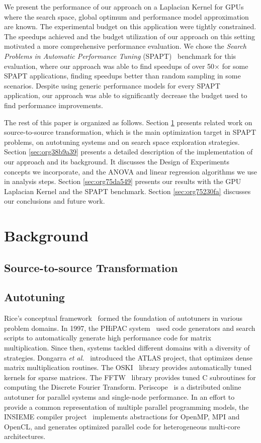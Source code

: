 \documentclass[conference]{IEEEtran}
\begin{document}
We present the performance of our approach on a Laplacian Kernel for GPUs where
the search space, global optimum and performance model approximation are known.
The experimental budget on this application were tightly constrained. The
speedups achieved and the budget utilization of our approach on this setting
motivated a more comprehensive performance evaluation. We chose the \emph{Search
Problems in Automatic Performance Tuning}
(SPAPT)~\cite{balaprakash2012spapt} benchmark for this evaluation, where
our approach was able to find speedups of over 50\(\times\) for some SPAPT
applications, finding speedups better than random sampling in some scenarios.
Despite using generic performance models for every SPAPT application, our
approach was able to significantly decrease the budget used to find performance
improvements.

The rest of this paper is organized as follows. Section \ref{sec:orgd95c21a} presents
related work on source-to-source transformation, which is the main optimization
target in SPAPT problems, on autotuning systems and on search space exploration
strategies. Section \ref{sec:org38b9a39} presents a
detailed description of the implementation of our approach and its background.
It discusses the Design of Experiments concepts we incorporate, and the ANOVA
and linear regression algorithms we use in analysis steps. Section \ref{sec:org75da549} presents our results with the GPU Laplacian Kernel and the SPAPT
benchmark. Section \ref{sec:org75230fa} discusses our conclusions and future work.
\section{Background}
\label{sec:orgd95c21a}
\subsection{Source-to-source Transformation}
\label{sec:orgfffd14c}
\subsection{Autotuning}
\label{sec:orgcbb3bc8}
Rice's conceptual framework~\cite{rice1976algorithm} formed the foundation
of autotuners in various problem domains. In 1997, the PHiPAC
system~\cite{bilmes1997optimizing} used code generators and search scripts
to automatically generate high performance code for matrix multiplication. Since
then, systems tackled different domains with a diversity of strategies. Dongarra
\emph{et al.}~\cite{dongarra1998automatically} introduced the ATLAS
project, that optimizes dense matrix multiplication routines. The
OSKI~\cite{vuduc2005oski} library provides automatically tuned kernels for
sparse matrices. The FFTW~\cite{frigo1998fftw} library provides tuned C
subroutines for computing the Discrete Fourier Transform.
Periscope~\cite{gerndt2010automatic} is a distributed online autotuner for
parallel systems and single-node performance. In an effort to provide a common
representation of multiple parallel programming models, the INSIEME compiler
project~\cite{jordan2012multi} implements abstractions for OpenMP, MPI and
OpenCL, and generates optimized parallel code for heterogeneous multi-core
architectures.
\end{document}
